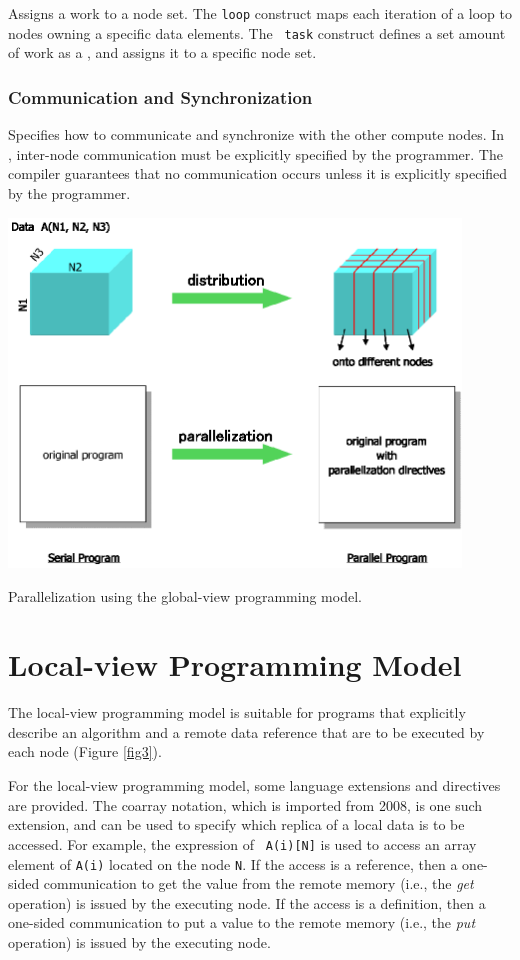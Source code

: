 Assigns a work to a node set. The {\tt loop} construct maps each
iteration of a loop to nodes owning a specific data elements. The {\tt
task} construct defines a set amount of work as a {\it {}}, and
assigns it to a specific node set.

\subsubsection*{Communication and Synchronization}

Specifies how to communicate and synchronize with the other compute
nodes. In {\XMP}, inter-node communication must be explicitly specified
by the programmer. The compiler guarantees that no communication occurs
unless it is explicitly specified by the programmer.

\begin{myfigure}
\includegraphics[width=12cm]{figs/Fig2.eps}
  \caption{Parallelization using the global-view programming model.}
\label{fig2}
\end{myfigure}

\section{Local-view Programming Model}

The local-view programming model is suitable for programs that
explicitly describe an algorithm and a remote data reference that are to
be executed by each node (Figure \ref{fig3}).

For the local-view programming model, some language extensions and 
directives are provided. The coarray notation, which is imported from
{\Fort} 2008,
is one such extension, and can be used to specify which replica of a
local data is to be accessed. For example, the expression of {\tt
A(i)[N]} is used to access an array element of {\tt A(i)} located on the
node {\tt N}.
%
If the access is a reference, then a one-sided communication to get the
value from the remote memory (i.e., the {\it get} operation) is issued
by the executing node.
If the access is a definition, then a one-sided communication to put a
value to the remote memory (i.e., the {\it put} operation) is issued by
the executing node.

